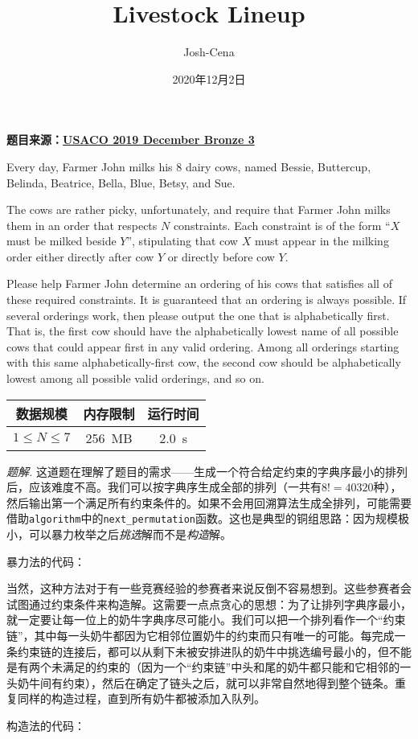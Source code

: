 \documentclass[UTF8,12pt]{ctexart}
\title{Livestock Lineup}
\author{Josh-Cena}
\date{2020年12月2日}
\begin{document}
\maketitle
\begin{mdframed}[style=Question]
    \textbf{题目来源：\href{http://www.usaco.org/index.php?page=viewproblem2&cpid=965}{USACO 2019 December Bronze 3}}

    Every day, Farmer John milks his 8 dairy cows, named Bessie, Buttercup, Belinda, Beatrice, Bella, Blue, Betsy, and Sue.

    The cows are rather picky, unfortunately, and require that Farmer John milks them in an order that respects $N$ constraints. Each constraint is of the form ``$X$ must be milked beside $Y$'', stipulating that cow $X$ must appear in the milking order either directly after cow $Y$ or directly before cow $Y$.

    Please help Farmer John determine an ordering of his cows that satisfies all of these required constraints. It is guaranteed that an ordering is always possible. If several orderings work, then please output the one that is alphabetically first. That is, the first cow should have the alphabetically lowest name of all possible cows that could appear first in any valid ordering. Among all orderings starting with this same alphabetically-first cow, the second cow should be alphabetically lowest among all possible valid orderings, and so on.

    \begin{table}[H]
        \centering
        \begin{tabular}{|c|c|c|}\hline
            数据规模&内存限制&运行时间\\\hline
            $1\le N\le 7$&\SI{256}{MB}&\SI{2.0}{s}\\\hline
        \end{tabular}
    \end{table}
\end{mdframed}
\textit{题解.} 这道题在理解了题目的需求——生成一个符合给定约束的字典序最小的排列后，应该难度不高。我们可以按字典序生成全部的排列（一共有$8!=40320$种），然后输出第一个满足所有约束条件的。如果不会用回溯算法生成全排列，可能需要借助\texttt{algorithm}中的\texttt{next\_permutation}函数。这也是典型的铜组思路：因为规模极小，可以暴力枚举之后\textit{挑选}解而不是\textit{构造}解。

暴力法的代码：



当然，这种方法对于有一些竞赛经验的参赛者来说反倒不容易想到。这些参赛者会试图通过约束条件来构造解。这需要一点点贪心的思想：为了让排列字典序最小，就一定要让每一位上的奶牛字典序尽可能小。我们可以把一个排列看作一个“约束链”，其中每一头奶牛都因为它相邻位置奶牛的约束而只有唯一的可能。每完成一条约束链的连接后，都可以从剩下未被安排进队的奶牛中挑选编号最小的，但不能是有两个未满足的约束的（因为一个“约束链”中头和尾的奶牛都只能和它相邻的一头奶牛间有约束），然后在确定了链头之后，就可以非常自然地得到整个链条。重复同样的构造过程，直到所有奶牛都被添加入队列。

构造法的代码：


\end{document}

